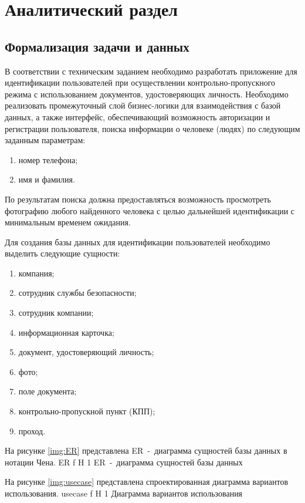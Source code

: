 \chapter{Аналитический раздел}

\section{Формализация задачи и данных}

В соответствии с техническим заданием необходимо разработать приложение для идентификации пользователей при осуществлении контрольно-пропускного режима с использованием документов, удостоверяющих личность.
Необходимо реализовать промежуточный слой бизнес-логики для взаимодействия с базой данных, а также интерфейс, обеспечивающий возможность авторизации и регистрации пользователя, поиска информации о человеке (людях) по следующим заданным параметрам:
\begin{enumerate}
	\item номер телефона;
	\item имя и фамилия.
\end{enumerate}
По результатам поиска должна предоставляться возможность просмотреть фотографию любого найденного человека с целью дальнейшей идентификации с минимальным временем ожидания.

Для создания базы данных для идентификации пользователей необходимо выделить следующие сущности:
\begin{enumerate}
	\item компания;
	\item сотрудник службы безопасности;
	\item сотрудник компании;
	\item информационная карточка;
	\item документ, удостоверяющий личность;
	\item фото;
	\item поле документа;
	\item контрольно-пропускной пункт (КПП);
	\item проход.
\end{enumerate}

На рисунке \ref{img:ER} представлена ER~-~диаграмма сущностей базы данных в нотации Чена.
	{ER}
	{f}
	{H}
	{1\textwidth}
	{ER~-~диаграмма сущностей базы данных}

На рисунке \ref{img:usecase} представлена спроектированная диаграмма вариантов использования.
	{usecase}
	{f}
	{H}
	{1\textwidth}
	{Диаграмма вариантов использования}

